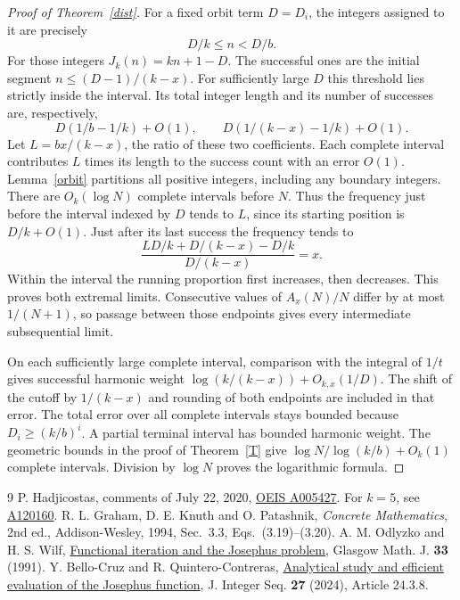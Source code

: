 \documentclass[11pt]{article}
\begin{document}
\clearpage
\begin{proof}[Proof of Theorem~\ref{dist}]
For a fixed orbit term $D=D_i$, the integers assigned to it are precisely
\[
 D/k\le n<D/b .
\]
For those integers $J_k(n)=kn+1-D$. The successful ones are the initial segment $n\le(D-1)/(k-x)$. For sufficiently large $D$ this threshold lies strictly inside the interval. Its total integer length and its number of successes are, respectively,
\[
 D(1/b-1/k)+O(1),\qquad D(1/(k-x)-1/k)+O(1).
\]
Let $L=bx/(k-x)$, the ratio of these two coefficients. Each complete interval contributes $L$ times its length to the success count with an error $O(1)$. Lemma~\ref{orbit} partitions all positive integers, including any boundary integers. There are $O_k(\log N)$ complete intervals before $N$. Thus the frequency just before the interval indexed by $D$ tends to $L$, since its starting position is $D/k+O(1)$. Just after its last success the frequency tends to
\[
 \frac{L D/k+D/(k-x)-D/k}{D/(k-x)}=x.
\]
Within the interval the running proportion first increases, then decreases. This proves both extremal limits. Consecutive values of $A_x(N)/N$ differ by at most $1/(N+1)$, so passage between those endpoints gives every intermediate subsequential limit.

On each sufficiently large complete interval, comparison with the integral of $1/t$ gives successful harmonic weight $\log(k/(k-x))+O_{k,x}(1/D)$. The shift of the cutoff by $1/(k-x)$ and rounding of both endpoints are included in that error. The total error over all complete intervals stays bounded because $D_i\ge(k/b)^i$. A partial terminal interval has bounded harmonic weight. The geometric bounds in the proof of Theorem~\ref{T} give $\log N/\log(k/b)+O_k(1)$ complete intervals. Division by $\log N$ proves the logarithmic formula.
\end{proof}
\begin{thebibliography}{9}\small
{} P. Hadjicostas, comments of July 22, 2020, \href{https://oeis.org/A005427}{OEIS A005427}. For $k=5$, see \href{https://oeis.org/A120160}{A120160}.
 R. L. Graham, D. E. Knuth and O. Patashnik, \emph{Concrete Mathematics}, 2nd ed., Addison-Wesley, 1994, Sec.~3.3, Eqs.~(3.19)--(3.20).
 A. M. Odlyzko and H. S. Wilf, \href{https://doi.org/10.1017/S0017089500008272}{Functional iteration and the Josephus problem}, Glasgow Math. J. \textbf{33} (1991).
 Y. Bello-Cruz and R. Quintero-Contreras, \href{https://cs.uwaterloo.ca/journals/JIS/VOL27/Cruz/cruz4.pdf}{Analytical study and efficient evaluation of the Josephus function}, J. Integer Seq. \textbf{27} (2024), Article 24.3.8.
\end{thebibliography}
\end{document}
